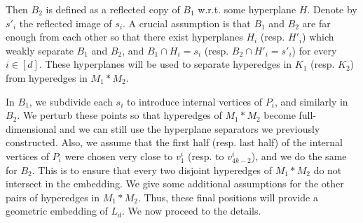 \documentclass{article}
\theoremstyle{definition}
\begin{document}
Then $B_2$ is defined as a reflected copy of $B_1$ w.r.t. some hyperplane $H$. Denote by $s'_i$ the reflected image of $s_i$. A crucial assumption is that $B_1$ and $B_2$ are far enough from each other so that there exist hyperplanes $H_i$ (resp. $H'_i$) which weakly separate $B_1$ and $B_2$, and $B_1 \cap H_i=s_i$ (resp. $B_2 \cap H'_i=s'_i$) for every $i\in [d]$. 
These hyperplanes will be used to separate hyperedges in $K_1$ (resp. $K_2$) from  hyperedges in $M_1*M_2$.

In $B_1$, we subdivide each $s_i$ to introduce internal vertices of $P_i$, and similarly in $B_2$. We perturb these points so that hyperedges of $M_1*M_2$ become full-dimensional and we can still use the hyperplane separators we previously constructed. Also, we assume that the first half (resp. last half) of the internal vertices of $P_i$ were chosen very close to $v_1^i$ (resp. to $v_{4k-2}^i$), and we do the same for $B_2$. This is to ensure that every two disjoint hyperedges of $M_1*M_2$ do not  intersect in the embedding. We give some additional assumptions for the other pairs of hyperedges in $M_1*M_2$.  
Thus, these final positions will provide a geometric embedding of $L_d$. We now proceed to the details.
\end{document}
